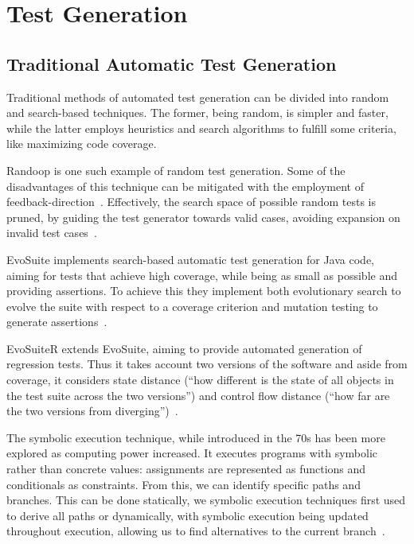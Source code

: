 
\section{Test Generation}

\subsection{Traditional Automatic Test Generation}

Traditional methods of automated test generation can be divided into random and search-based techniques. The former, being random, is simpler and faster, while the latter employs heuristics and search algorithms to fulfill some criteria, like maximizing code coverage.

Randoop is one such example of random test generation. Some of the disadvantages of this technique can be mitigated with the employment of feedback-direction~\citep{kn:randoop}. Effectively, the search space of possible random tests is pruned, by guiding the test generator towards valid cases, avoiding expansion on invalid test cases~\citep{kn:randoop}.

EvoSuite implements search-based automatic test generation for Java code, aiming for tests that achieve high coverage, while being as small as possible and providing assertions. To achieve this they implement both evolutionary search to evolve the suite with respect to a coverage criterion and mutation testing to generate assertions~\citep{kn:evosuite}.

EvoSuiteR extends EvoSuite, aiming to provide automated generation of regression tests. Thus it takes account two versions of the software and aside from coverage, it considers state distance (``how different is the state of
all objects in the test suite across the two versions'') and control flow distance (``how
far are the two versions from diverging'')~\citep{kn:evosuiter}.

The symbolic execution technique, while introduced in the 70s has been more explored as computing power increased. It executes programs with symbolic rather than concrete values: assignments are represented as functions and conditionals as constraints. From this, we can identify specific paths and branches. This can be done statically, we symbolic execution techniques first used to derive all paths or dynamically, with symbolic execution being updated throughout execution, allowing us to find alternatives to the current branch~\citep{kn:symbolicexec}.


